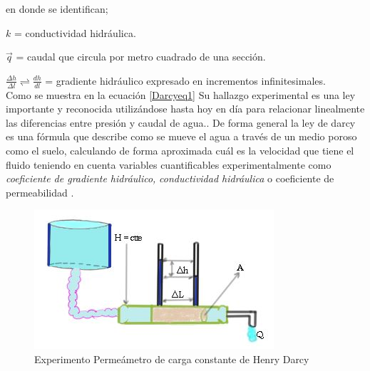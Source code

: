 en donde se identifican; 

$k$ = conductividad hidráulica.

$\Vec{q}$ = caudal que circula por metro 
cuadrado de una sección.

$\frac{\varDelta{h}}{\varDelta{l}} \rightleftharpoons \frac{dh}{dl}$ = gradiente hidráulico expresado en incrementos infinitesimales.\\


Como se muestra en  la ecuación \eqref{Darcyeq1} Su hallazgo experimental es una ley importante y reconocida utilizándose hasta hoy en día para relacionar linealmente las diferencias entre presión y caudal de agua.\parencite{schweizer2015darcy}. De forma general la ley de darcy es una fórmula que describe como se mueve el agua a través de un medio poroso como el suelo, calculando de forma aproximada cuál es la velocidad que tiene el fluido teniendo en cuenta variables cuantificables experimentalmente como \textit{coeficiente de gradiente hidráulico,} \textit{conductividad hidráulica} o coeficiente de permeabilidad \parencite{rozas2002permeabilidad}.

\begin{figure}[h]
	\centering
	\includegraphics[scale=1]{Imagenes/Ley de Darcy 01.JPG}
	\caption{Experimento Permeámetro de carga constante de  Henry Darcy}
	\label{Darcy01}
\end{figure}

